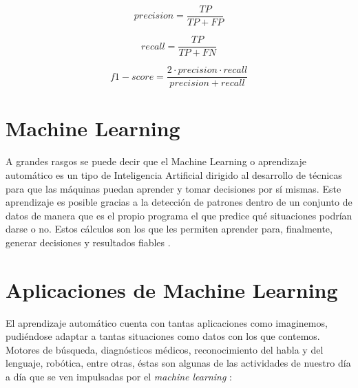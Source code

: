 \begin{equation}\label{eq:Aprecision}
precision = \frac{ TP}{TP+FP}
\end{equation}

\begin{equation}\label{eq:Arecall}
recall = \frac{ TP}{TP+FN}
\end{equation}

\begin{equation}\label{eq:Af1score}
f1-score = \frac{2 \cdot precision\cdot recall}{precision+ recall}
\end{equation}



\section{Machine Learning}
A grandes rasgos se puede decir que el Machine Learning o aprendizaje
automático es un tipo de Inteligencia Artificial dirigido al desarrollo de técnicas para que
las máquinas puedan aprender y tomar decisiones por sí mismas.
Este aprendizaje es posible gracias a la detección de patrones dentro de un
conjunto de datos de manera que es el propio programa el que predice qué situaciones
podrían darse o no. Estos cálculos son los que les permiten aprender para, finalmente,
generar decisiones y resultados fiables \cite{31MLApplications}.

\section{Aplicaciones de Machine Learning}
El aprendizaje automático cuenta con tantas aplicaciones como imaginemos,
pudiéndose adaptar a tantas situaciones como datos con los que contemos. Motores de
búsqueda, diagnósticos médicos, reconocimiento del habla y del lenguaje, robótica, entre
otras, éstas son algunas de las actividades de nuestro día a día que se ven impulsadas por
el \textit{machine learning} \cite{31MLApplications}:


